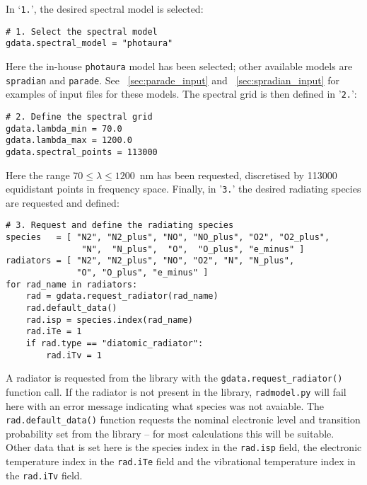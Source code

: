 \noindent \topbar

\bottombar

In `\texttt{1.}', the desired spectral model is selected:

\begin{lstlisting}[basicstyle=\ttfamily\small]
# 1. Select the spectral model
gdata.spectral_model = "photaura"
\end{lstlisting}

Here the in-house \texttt{photaura} model has been selected; other available models are \texttt{spradian} and \texttt{parade}.
See \textsection~\ref{sec:parade_input} and \textsection~\ref{sec:spradian_input} for examples of input files for these models.
The spectral grid is then defined in '\texttt{2.}':

\begin{lstlisting}[basicstyle=\ttfamily\small]
# 2. Define the spectral grid
gdata.lambda_min = 70.0
gdata.lambda_max = 1200.0
gdata.spectral_points = 113000
\end{lstlisting}

\noindent Here the range $70 \leq \lambda \leq 1200$~nm has been requested, discretised by 113000 equidistant points in frequency space.
Finally, in '\texttt{3.}' the desired radiating species are requested and defined:

\begin{lstlisting}[basicstyle=\ttfamily\small]
# 3. Request and define the radiating species
species   = [ "N2", "N2_plus", "NO", "NO_plus", "O2", "O2_plus",
               "N",  "N_plus",  "O",  "O_plus", "e_minus" ]
radiators = [ "N2", "N2_plus", "NO", "O2", "N", "N_plus",
              "O", "O_plus", "e_minus" ]
for rad_name in radiators:
    rad = gdata.request_radiator(rad_name)
    rad.default_data()
    rad.isp = species.index(rad_name)
    rad.iTe = 1
    if rad.type == "diatomic_radiator":
        rad.iTv = 1
\end{lstlisting}

A radiator is requested from the library with the \texttt{gdata.request\_radiator()} function call.
If the radiator is not present in the library, \texttt{radmodel.py} will fail here with an error message indicating what species was not avaiable.  
The \texttt{rad.default\_data()} function requests the nominal electronic level and transition probability set from the library -- for most calculations this will be suitable.
Other data that is set here is the species index in the \texttt{rad.isp} field, the electronic temperature index in the \texttt{rad.iTe} field and the vibrational temperature index in the \texttt{rad.iTv} field.  

